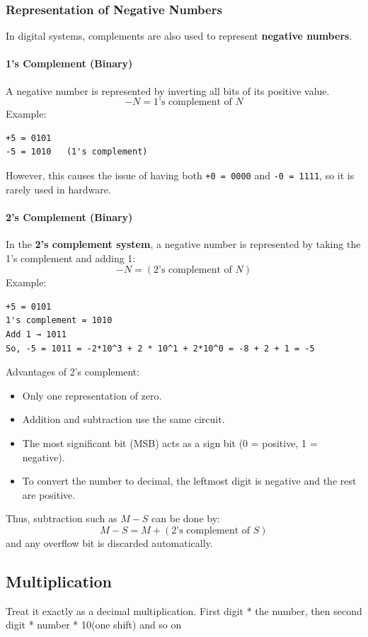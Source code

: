 \documentclass{article}
\begin{document}
\subsubsection{Representation of Negative Numbers}
In digital systems, complements are also used to represent \textbf{negative numbers}.

\paragraph{1's Complement (Binary)}
A negative number is represented by inverting all bits of its positive value.
\[
- N = \text{1's complement of } N
\]
Example:
\begin{verbatim}
+5 = 0101
-5 = 1010   (1's complement)
\end{verbatim}

However, this causes the issue of having both \texttt{+0 = 0000} and \texttt{-0 = 1111}, 
so it is rarely used in hardware.

\paragraph{2's Complement (Binary)}
In the \textbf{2’s complement system}, a negative number is represented by taking the 
1’s complement and adding 1:
\[
- N = (\text{2's complement of } N)
\]
Example:
\begin{verbatim}
+5 = 0101
1's complement = 1010
Add 1 → 1011
So, -5 = 1011 = -2*10^3 + 2 * 10^1 + 2*10^0 = -8 + 2 + 1 = -5 
\end{verbatim}



Advantages of 2's complement:
\begin{itemize}
  \item Only one representation of zero.
  \item Addition and subtraction use the same circuit.
  \item The most significant bit (MSB) acts as a sign bit (0 = positive, 1 = negative).
  \item To convert the number to decimal, the leftmost digit is negative and the rest are positive.
\end{itemize}

Thus, subtraction such as $M - S$ can be done by:
\[
M - S = M + (\text{2's complement of } S)
\]
and any overflow bit is discarded automatically.

\subsection{Multiplication}
Treat it exactly as a decimal multiplication. First digit * the number, then second digit * number * 10(one shift) and so on
\end{document}
